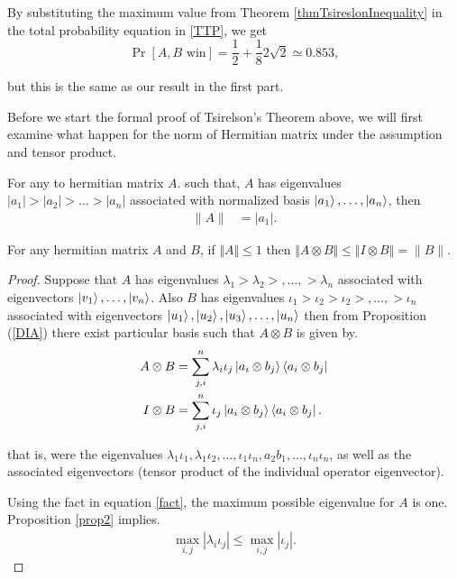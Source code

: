 By substituting the maximum value from Theorem \ref {thmTsireslonInequality} in the total probability equation in \ref{TTP}, we get
\begin{equation}
\Pr[A,B \text{ win}]=\frac{1}{2}+\frac{1}{8} 2\sqrt{2} \simeq 0.853,
\end{equation}

but this is the same as our result in the first part.

Before we start the formal proof of Tsirelson’s Theorem above, we will first examine what happen for the norm of Hermitian matrix under the assumption and tensor product.
\begin{prop}\label{prop2}
For any to hermitian  matrix $A$. such that, $A$ has eigenvalues $|a_1|>|a_2|>\ldots> |a_n|$  associated with normalized basis $\ket{a_1},\ldots,\ket{a_n}$, then 
\begin{align*}
\|A\|&=|a_1|.
\end{align*}
\end{prop}

\begin{lemma}
\label{lem:tensor-norm}
For any hermitian matrix $A$ and $B$, if $\Vert A\Vert \leqslant 1$ then $\Vert A\otimes B \Vert \leqslant \Vert I\otimes B \Vert=\|B\|$.
\end{lemma}

\begin{proof}
Suppose that $A$ has eigenvalues $\lambda_1>\lambda_2>,\ldots ,>\lambda_n$  associated with eigenvectors $\ket{v_1},\dots,\ket{v_n}$.
Also $B$ has eigenvalues $\iota_1>\iota_2>\iota_2>,\ldots, >\iota_n$ associated with eigenvectors $\ket{u_1},\ket{u_2},\ket{u_3}, \ldots ,\ket{u_n}$ then from Proposition (\ref{DIA}) there exist particular basis such that  $A\otimes B$ is given by.
\begin{align}
 A\otimes B&=\sum_{j,i}^n  \lambda_i \iota_j \ket{a_i\otimes b_j}\bra{a_i \otimes b_j}\\
  I\otimes B&=\sum_{j,i}^n \iota_j \ket{a_i\otimes b_j}\bra{a_i \otimes b_j}.
\end{align}

that is, were the eigenvalues $\lambda_1 \iota_1,\lambda_1 \iota_2,\ldots,\iota_1 \iota_n,a_2b_1,\dots ,\iota_n \iota_n$, as well as  the associated  eigenvectors (tensor product of the individual operator eigenvector).

Using the fact in equation \ref {fact}, the maximum possible eigenvalue for $A$ is one. Proposition \ref{prop2} implies.
\begin{align}
 \max_{i,j}|\lambda_i \iota_j|\leq \max_{i,j}|\iota_j|.
\end{align}

%

\end{proof}


